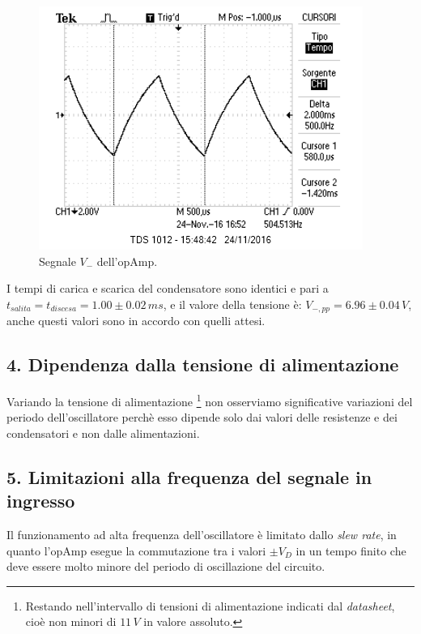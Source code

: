 \documentclass[10pt,a4paper]{article}
\begin{document}
\begin{figure}[htb!]
\centering
\includegraphics[scale=1.0]{immagini/multivibratoreVMENO.png}
\caption{Segnale $V_{-}$ dell'opAmp.}
\label{Vmeno}
\end{figure}

I tempi di carica e scarica del condensatore sono identici e pari a $t_{salita} = t_{discesa} = 1.00 \pm 0.02\, ms$, e il valore della tensione è: $V_{-, pp} = 6.96 \pm 0.04 \, V$, anche questi valori sono in accordo con quelli attesi.


\subsection*{4. Dipendenza dalla tensione di alimentazione}
Variando la tensione di alimentazione \footnote{Restando nell'intervallo di tensioni di alimentazione indicati dal \emph{datasheet}, cioè non minori di $11\,V$ in valore assoluto.} non osserviamo significative variazioni del periodo dell'oscillatore perchè esso dipende solo dai valori delle resistenze e dei condensatori e non dalle alimentazioni. 


\subsection*{5. Limitazioni alla frequenza del segnale in ingresso}
Il funzionamento ad alta frequenza dell'oscillatore è limitato dallo \emph{slew rate}, in quanto l'opAmp esegue la commutazione tra i valori $\pm V_{D}$ in un tempo finito che deve essere molto minore del periodo di oscillazione del circuito.
\end{document}
